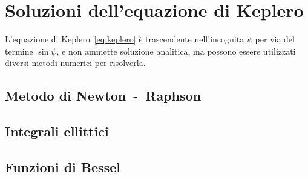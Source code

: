\section{Soluzioni dell'equazione di Keplero}
\label{sec:soluzioni}

L'equazione di Keplero~\eqref{eq:keplero} è trascendente nell'incognita $\psi$
per via del termine $\sin\psi$, e non ammette soluzione analitica, ma possono
essere utilizzati diversi metodi numerici per risolverla.

\subsection{Metodo di Newton~-~Raphson}
\label{sec:newton}

\subsection{Integrali ellittici}
\label{sec:integrali-ellittici}

\subsection{Funzioni di Bessel}
\label{sec:bessel}


